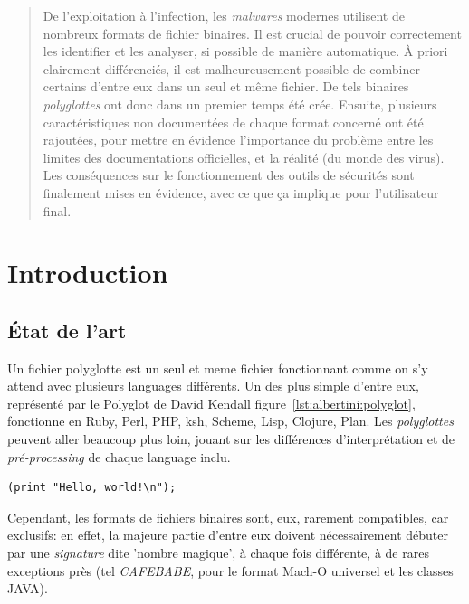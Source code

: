 



\maketitle
{}

\begin{abstract}
De l'exploitation à l'infection, les {\it malwares} modernes utilisent de nombreux formats de fichier binaires.
Il est crucial de pouvoir correctement les identifier et les analyser, si possible de manière automatique.
À priori clairement différenciés, il est malheureusement possible de combiner certains d'entre eux dans un seul et même fichier.
De tels binaires {\it polyglottes} ont donc dans un premier temps été crée. 
Ensuite, plusieurs caractéristiques non documentées de chaque format concerné ont été rajoutées, pour mettre en évidence l'importance du problème entre les limites des documentations officielles, et la réalité (du monde des virus).
Les conséquences sur le fonctionnement des outils de sécurités sont finalement mises en évidence, avec ce que ça implique pour l'utilisateur final.
\end{abstract}


\section{Introduction}

\subsection{État de l'art}

Un fichier polyglotte est un seul et meme fichier fonctionnant comme on s'y attend avec plusieurs languages différents.  Un des plus simple d'entre eux, représenté par le Polyglot de David Kendall figure~\ref{lst:albertini:polyglot}, fonctionne en Ruby, Perl, PHP, ksh, Scheme, Lisp, Clojure, Plan. Les {\it polyglottes} peuvent aller beaucoup plus loin, jouant sur les différences d'interprétation et de {\it pré-processing} de chaque language inclu.

\begin{lstlisting}[language={},caption={un programme polyglotte simple},label={lst:albertini:polyglot}]
 (print "Hello, world!\n");
\end{lstlisting}
Cependant, les formats de fichiers binaires sont, eux, rarement compatibles, car exclusifs: en effet, la majeure partie d'entre eux doivent nécessairement débuter par une {\it signature} dite 'nombre magique', à chaque fois différente, à de rares exceptions près (tel {\em CAFEBABE}, pour le format Mach-O universel et les classes JAVA).

